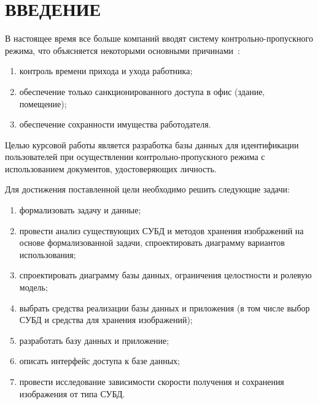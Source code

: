 \chapter*{ВВЕДЕНИЕ}

В настоящее время все больше компаний вводят систему контрольно-пропускного режима, что объясняется некоторыми основными причинами~\cite{introCPP}:
\begin{enumerate}
	\item контроль времени прихода и ухода работника;
	\item обеспечение только санкционированного доступа в офис (здание, помещение);
	\item обеспечение сохранности имущества работодателя.
\end{enumerate}

Целью курсовой работы является разработка базы данных для идентификации пользователей при осуществлении контрольно-пропускного режима с использованием документов, удостоверяющих личность.

Для достижения поставленной цели необходимо решить следующие задачи:
\begin{enumerate}
	\item формализовать задачу и данные;
	\item провести анализ существующих СУБД и методов хранения изображений на основе
	формализованной задачи, спроектировать диаграмму вариантов использования;
	\item спроектировать диаграмму базы данных, ограничения целостности и ролевую модель;
	\item выбрать средства реализации базы данных и приложения (в том числе выбор СУБД и средства для хранения изображений);
	\item разработать базу данных и приложение;
	\item описать интерфейс доступа к базе данных;
	\item провести исследование зависимости скорости получения и сохранения изображения от типа СУБД.
\end{enumerate}